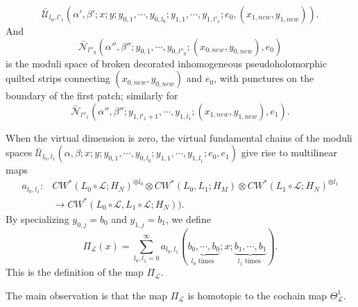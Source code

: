 \documentclass{amsart}
\numberwithin{equation}{section}
\numberwithin{figure}{section}
\begin{document}
\begin{equation*}
\bar{\mathcal{U}}_{l_{0}, l'_{1}}(\alpha', \beta'; x; y; y_{0, 1}, \cdots, y_{0, l_{0}}; y_{1, 1}, \cdots, y_{1, l'_{1}}; e_{0}, (x_{1, new}, y_{1, new})).
\end{equation*}
And 
\begin{equation*}
\bar{\mathcal{N}}_{l''_{0}}(\alpha'', \beta''; y_{0, 1}, \cdots, y_{0, l''_{0}}; (x_{0, new}, y_{0, new}), e_{0})
\end{equation*}
is the moduli space of broken decorated inhomogeneous pseudoholomorphic quilted strips connecting $(x_{0, new}, y_{0, new})$ and $e_{0}$, with punctures on the boundary of the first patch; similarly for 
\begin{equation*}
\bar{\mathcal{N}}_{l''_{1}}(\alpha'', \beta''; y_{1, l'_{1}+1}, \cdots, y_{1, l_{1}}; (x_{1, new}, y_{1, new}), e_{1}).
\end{equation*} \par
	When the virtual dimension is zero, the virtual fundamental chains of the moduli spaces $\bar{\mathcal{U}}_{l_{0}, l_{1}}(\alpha, \beta; x; y; y_{0, 1}, \cdots, y_{0, l_{0}}; y_{1, 1}, \cdots, y_{1, l_{1}}; e_{0}, e_{1})$ give rise to multilinear maps
\begin{equation}
\begin{split}
a_{l_{0}, l_{1}}: & CW^{*}(L_{0} \circ \mathcal{L}; H_{N})^{\otimes l_{0}} \otimes CW^{*}(L_{0}, L_{1}; H_{M}) \otimes CW^{*}(L_{1} \circ \mathcal{L}; H_{N})^{\otimes l_{1}}\\
& \to CW^{*}(L_{0} \circ \mathcal{L}, L_{1} \circ \mathcal{L}; H_{N})).
\end{split}
\end{equation}
By specializing $y_{0, j} = b_{0}$ and $y_{1, j} = b_{1}$, we define
\begin{equation}
\Pi_{\mathcal{L}}(x) = \sum_{l_{0}, l_{1} = 0}^{\infty} a_{l_{0}, l_{1}}(\underbrace{b_{0}, \cdots, b_{0}}_{l_{0} \text{ times }}; x; \underbrace{b_{1}, \cdots, b_{1}}_{l_{1} \text{ times }}).
\end{equation} 
This is the definition of the map $\Pi_{\mathcal{L}}$. \par
	The main observation is that the map $\Pi_{\mathcal{L}}$ is homotopic to the cochain map $\Theta_{\mathcal{L}}^{1}$. \par
\end{document}
